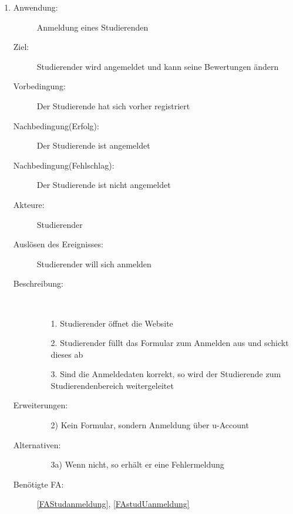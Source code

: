 \documentclass[parskip=full]{scrartcl}
\newcommand{\swtLabel}[1]{\textbf{/#1\arabic*0/}}
\begin{document}
\begin{enumerate}[label=\swtLabel{S}]
  \item \label{UCstudAnmeldung}
    \begin{description}
    \item[Anwendung:] Anmeldung eines Studierenden
    \item[Ziel:] Studierender wird angemeldet und kann seine Bewertungen ändern
  	\item[Vorbedingung:] Der Studierende hat sich vorher registriert
  	\item[Nachbedingung(Erfolg):] Der Studierende ist angemeldet
  	\item[Nachbedingung(Fehlschlag):] Der Studierende ist nicht angemeldet
  	\item[Akteure:] Studierender
  	\item[Auslösen des Ereignisses:] Studierender will sich anmelden
  	\item[Beschreibung:]~
  	\begin{enumerate}
  	  \item[1.] Studierender öffnet die Website
  	  \item[2.] Studierender füllt das Formular zum Anmelden aus und schickt
  	  dieses ab %
  	  \item[3.] Sind die Anmeldedaten korrekt, so wird der Studierende zum
  	  Studierendenbereich weitergeleitet
  	\end{enumerate}
  	\item[Erweiterungen:]
  	\begin{enumerate}
  	  \item[2)] Kein Formular, sondern Anmeldung über u-Account
  	\end{enumerate}    	
  	\item[Alternativen:]
	\begin{enumerate}
  	  \item[3a)] Wenn nicht, so erhält er eine Fehlermeldung
  	\end{enumerate}
  	\item[Benötigte FA:] \ref{FAStudanmeldung}, \ref{FAstudUanmeldung}
  \end{description}
   

\end{enumerate}
\end{document}
